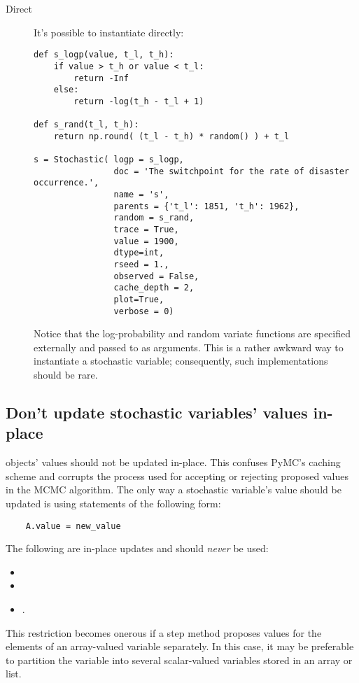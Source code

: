 \begin{description}
    \item[Direct] It's possible to instantiate  directly:
\begin{verbatim}
def s_logp(value, t_l, t_h):
    if value > t_h or value < t_l:
        return -Inf
    else:
        return -log(t_h - t_l + 1)

def s_rand(t_l, t_h):
    return np.round( (t_l - t_h) * random() ) + t_l

s = Stochastic( logp = s_logp,
                doc = 'The switchpoint for the rate of disaster occurrence.',
                name = 's',
                parents = {'t_l': 1851, 't_h': 1962},
                random = s_rand,
                trace = True,
                value = 1900,
                dtype=int,
                rseed = 1.,
                observed = False,
                cache_depth = 2,
                plot=True,
                verbose = 0)
\end{verbatim}
Notice that the log-probability and random variate functions are specified externally and passed to  as arguments. This is a rather awkward way to instantiate a stochastic variable; consequently, such implementations should be rare.

\end{description}

\begin{center}
\begin{boxedminipage}{.9\textwidth}
\subsection{Don't update stochastic variables' values in-place}


 objects' values should not be updated in-place. This confuses PyMC's caching scheme and corrupts the process used for accepting or rejecting proposed values in the MCMC algorithm. The only way a stochastic variable's value should be updated is using statements of the following form:
\begin{verbatim}
    A.value = new_value
\end{verbatim}
The following are in-place updates and should \emph{never} be used:
\begin{itemize}
    \item {}
    \item {}
    \item {}.
\end{itemize}

This restriction becomes onerous if a step method proposes values for the elements of an array-valued variable separately. In this case, it may be preferable to partition the variable into several scalar-valued variables stored in an array or list.
\end{boxedminipage}
\end{center}

